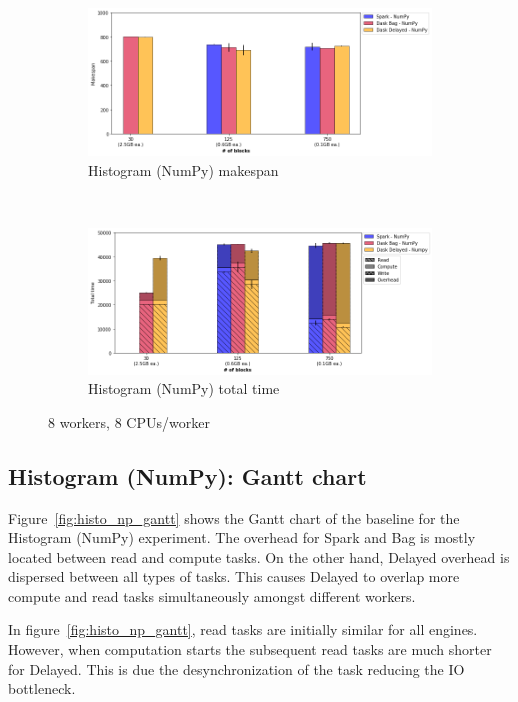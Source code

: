 \documentclass[conference]{IEEEtran}
\begin{document}
\begin{figure}[!t]
    \centering
    \begin{subfigure}[b]{\columnwidth}
        \includegraphics[clip,width=\columnwidth]{images/histo_np_block.png}%
        \caption{Histogram (NumPy) makespan}\label{fig:histo_np_ms_block}
    \end{subfigure}
    \\
    \begin{subfigure}[b]{\columnwidth}
        \includegraphics[clip,width=\columnwidth]{images/histo_idle_np_block.png}%
        \caption{Histogram (NumPy) total time}\label{fig:histo_np_tt_block}
    \end{subfigure}
    \caption{8 workers, 8 CPUs/worker}
\end{figure}

\subsection{Histogram (NumPy): Gantt chart}
Figure~\ref{fig:histo_np_gantt} shows the Gantt chart of the baseline for the
Histogram (NumPy) experiment. The overhead for Spark and Bag is mostly located
between read and compute tasks. On the other hand, Delayed
overhead is dispersed between all types of tasks. This causes Delayed to
overlap more compute and read tasks simultaneously amongst different workers.

In figure~\ref{fig:histo_np_gantt}, read tasks are initially similar for all
engines. However, when computation starts the subsequent read tasks are much
shorter for Delayed. This is due the desynchronization of the task reducing the
IO bottleneck.
\end{document}
